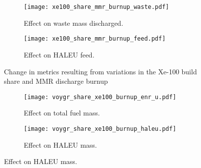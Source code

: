 \begin{figure}
    \ContinuedFloat    
    \begin{subfigure}[b]{0.48\textwidth}
        \centering
        \texttt{[image: xe100\_share\_mmr\_burnup\_waste.pdf]}
        \caption{Effect on waste mass discharged.}
        \label{fig:xe100_share_mmr_burnup_waste}
    \end{subfigure}
    \hfill
    \begin{subfigure}[b]{0.48\textwidth}
        \centering
        \texttt{[image: xe100\_share\_mmr\_burnup\_feed.pdf]}
        \caption{Effect on HALEU feed.}
        \label{fig:xe100_share_mmr_burnup_feed}
    \end{subfigure}
    \caption{Change in metrics resulting from variations in the 
    Xe-100 build share and MMR discharge burnup}
    \label{fig:xe100_share_mmr_burnup}
\end{figure}
\begin{figure}
    \begin{subfigure}[b]{0.48\textwidth}
        \centering
        \texttt{[image: voygr\_share\_xe100\_burnup\_enr\_u.pdf]}
        \caption{Effect on total fuel mass.}
        \label{fig:voygr_share_xe100_burnup_enr_u}
    \end{subfigure}
    \hfill
    \begin{subfigure}[b]{0.48\textwidth}
        \centering
        \texttt{[image: voygr\_share\_xe100\_burnup\_haleu.pdf]}
        \caption{Effect on HALEU mass.}
        \label{fig:voygr_share_xe100_burnup_haleu}
    \end{subfigure}
\end{figure}

